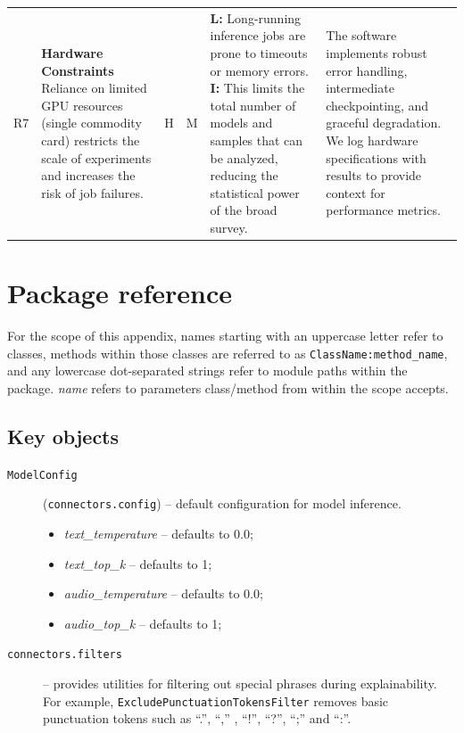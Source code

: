 \begin{appendices}
{\begin{longtable}{@{} p{0.3cm} p{4cm} p{0.2cm} p{0.2cm} p{4.6cm} p{4.6cm} @{}}
        R7 & \textbf{Hardware Constraints} \newline Reliance on limited GPU resources (single commodity card) restricts the scale of experiments and increases the risk of job failures. & H & M & \textbf{L:} Long-running inference jobs are prone to timeouts or memory errors. \textbf{I:} This limits the total number of models and samples that can be analyzed, reducing the statistical power of the broad survey. & The software implements robust error handling, intermediate checkpointing, and graceful degradation. We log hardware specifications with results to provide context for performance metrics. \\

    \end{longtable}
    }


\chapter{Package reference}
\label{app:package_reference}

For the scope of this appendix, names starting with an uppercase letter refer to classes, methods within those classes are referred to as \texttt{ClassName:method\_name}, and any lowercase dot-separated strings refer to module paths within the package. \textit{name} refers to parameters class/method from within the scope accepts.

\section{Key objects}
\label{sec:package__func}

\begin{description}
    \item[\texttt{ModelConfig}] (\texttt{connectors.config}) -- default configuration for model inference.
        \begin{itemize}
            \item \textit{text\_temperature} -- defaults to 0.0;
            \item \textit{text\_top\_k} -- defaults to 1;
            \item \textit{audio\_temperature} -- defaults to 0.0;
            \item \textit{audio\_top\_k} -- defaults to 1;
        \end{itemize}

    \item[\texttt{connectors.filters}] – provides utilities for filtering out special phrases during explainability. For example, \texttt{ExcludePunctuationTokensFilter} removes basic punctuation tokens such as ``.'', ``,'' , ``!'', ``?'', ``;'' and ``:''.


\end{description}
\end{appendices}
